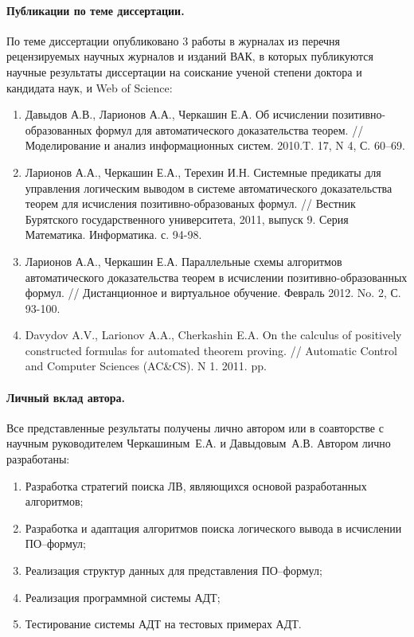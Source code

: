 \paragraph{Публикации по теме диссертации.} По теме диссертации опубликовано 3 работы в журналах из перечня рецензируемых научных журналов и изданий ВАК, в которых публикуются научные результаты диссертации на соискание ученой степени доктора и кандидата наук, и Web of Science:
\begin{enumerate}
\item Давыдов А.В., Ларионов А.А., Черкашин Е.А. Об исчислении
позитивно-образованных формул для автоматического доказательства
теорем. // Моделирование и анализ информационных систем. 2010.T. 17, N
4, С. 60--69.
\item Ларионов А.А., Черкашин Е.А., Терехин И.Н. Системные предикаты для
управления логическим выводом в системе автоматического доказательства
теорем для исчисления позитивно-образованых формул. // Вестник
Бурятского государственного университета, 2011, выпуск 9. Серия
Математика. Информатика. с. 94-98.
\item Ларионов А.А., Черкашин Е.А. Параллельные схемы алгоритмов
автоматического доказательства теорем в исчислении
позитивно-образованных формул. // Дистанционное и виртуальное
обучение. Февраль 2012. No. 2, С. 93-100.
\item Davydov A.V., Larionov A.A., Cherkashin E.A. On the calculus of
positively constructed formulas for automated theorem proving. //
Automatic Control and Computer Sciences (AC\&CS). N 1. 2011. pp.~
\end{enumerate}

\paragraph{Личный вклад автора.} Все представленные результаты получены лично автором или в соавторстве с научным руководителем Черкашиным~Е.А. и Давыдовым~А.В. Автором лично разработаны:
\begin{enumerate}
\item Разработка стратегий поиска ЛВ, являющихся основой разработанных алгоритмов;
\item Разработка и адаптация алгоритмов поиска логического вывода в исчислении ПО--формул;
\item Реализация структур данных для представления ПО--формул;
\item Реализация программной системы АДТ;
\item Тестирование системы АДТ на тестовых примерах АДТ.
\end{enumerate}

